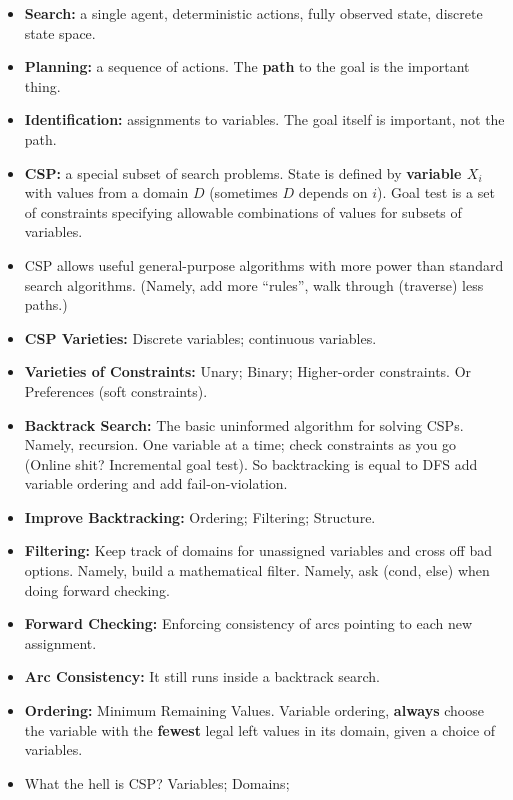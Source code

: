 \documentclass[twocolumn]{article}
\begin{document}
\begin{itemize}
\item \textbf{Search:} a single agent, deterministic actions, fully
  observed state, discrete state space.
\item \textbf{Planning:} a sequence of actions. The \textbf{path} to
  the goal is the important thing.
\item \textbf{Identification:} assignments to variables. The goal
  itself is important, not the path.
\item \textbf{CSP:} a special subset of search problems. State is
  defined by \textbf{variable $X_{i}$} with values from a domain $D$
  (sometimes $D$ depends on $i$). Goal test is a set of constraints
  specifying allowable combinations of values for subsets of
  variables. 
\item CSP allows useful general-purpose algorithms with more power
  than standard search algorithms. (Namely, add more ``rules'', walk
  through (traverse) less paths.)
\item \textbf{CSP Varieties:} Discrete variables; continuous
  variables.
\item \textbf{Varieties of Constraints:} Unary; Binary; Higher-order
  constraints. Or Preferences (soft constraints).
\item \textbf{Backtrack Search:} The basic uninformed algorithm for
  solving CSPs. Namely, recursion. One variable at a time; check
  constraints as you go (Online shit? Incremental goal test). So
  backtracking is equal to DFS add variable ordering and add
  fail-on-violation. 
\item \textbf{Improve Backtracking:} Ordering; Filtering; Structure. 
\item \textbf{Filtering:} Keep track of domains for unassigned
  variables and cross off bad options. Namely, build a mathematical
  filter. Namely, ask (cond, else) when doing forward checking.
\item \textbf{Forward Checking:} Enforcing consistency of arcs
  pointing to each new assignment. 
\item \textbf{Arc Consistency:} It still runs inside a backtrack
  search.
\item \textbf{Ordering:} Minimum Remaining Values. Variable ordering,
  \textbf{always} choose the variable with the \textbf{fewest} legal
  left values in its domain, given a choice of variables.
\item What the hell is CSP? Variables; Domains;

\end{itemize}
\end{document}
